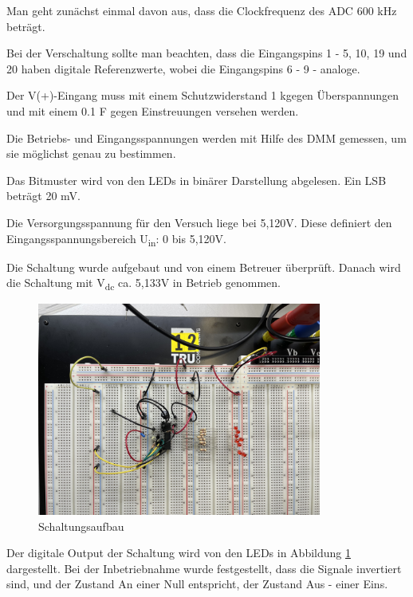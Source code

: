 Man geht zunächst einmal davon aus, dass die Clockfrequenz des ADC 600 kHz beträgt.\par
Bei der Verschaltung sollte man beachten, dass die Eingangspins 1 - 5, 10, 19 und 20 
haben digitale Referenzwerte, wobei die Eingangspins 6 - 9 - analoge.\par
Der V(+)-Eingang muss mit einem Schutzwiderstand 1 k\textOmega  gegen Überspannungen 
und mit einem 0.1 \textmu F gegen Einstreuungen versehen werden. \par

Die Betriebs- und Eingangsspannungen werden mit Hilfe des \acs{DMM} gemessen, um sie möglichst 
genau zu bestimmen.\par
Das Bitmuster wird von den \acs{LED}s in binärer Darstellung abgelesen. Ein \acs{LSB} beträgt 20 mV.\par
Die Versorgungsspannung für den Versuch liege bei 5,120V. Diese definiert den 
Eingangsspannungsbereich U\textsubscript{in}: 0 bis 5,120V. \newline


Die Schaltung wurde aufgebaut und von einem Betreuer überprüft. Danach wird die Schaltung
mit V\textsubscript{dc} ca. 5,133V in Betrieb genommen. \par

\begin{figure}[H]
	\centering
	\includegraphics[height=7cm]{images/Schaltungsaufbau-versuch-eins.jpeg} 
	\caption{Schaltungsaufbau}
	\label{fig: Schaltungsaufbau}
\end{figure}

Der digitale Output der Schaltung wird von den \acs{LED}s in Abbildung 
\ref{fig: Schaltungsaufbau} dargestellt.
Bei der Inbetriebnahme wurde festgestellt, dass die Signale invertiert sind, 
und der Zustand An einer Null entspricht, der Zustand Aus - einer Eins.

